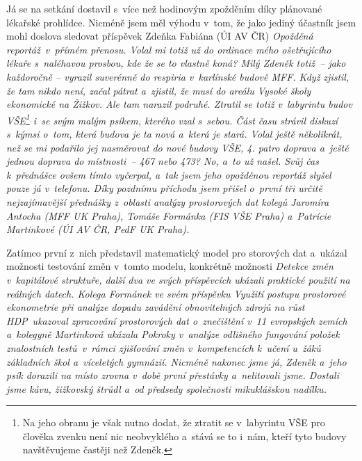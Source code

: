 Já se na setkání dostavil s~více než hodinovým zpožděním díky plánované lékařské prohlídce. Nicméně jsem měl výhodu v~tom, že jako jediný účastník jsem mohl doslova sledovat příspěvek Zdeňka Fabiána (ÚI AV ČR) \em Opožděná reportáž\em\ v~přímém přenosu. Volal mi totiž už do ordinace mého ošetřujícího lékaře s~naléhavou prosbou, kde že se to vlastně koná? Milý Zdeněk totiž~-- jako každoročně -- vyrazil suverénně do respiria v~karlínské budově MFF. Když zjistil, že tam nikdo není, začal pátrat a~zjistil, že musí do areálu Vysoké školy ekonomické na Žižkov. Ale tam narazil podruhé. Ztratil se totiž v~labyrintu budov VŠE\footnote{Na jeho obranu je však nutno dodat, že ztratit se v~labyrintu VŠE pro člověka zvenku není nic neobvyklého a~stává se to i~nám, kteří tyto budovy navštěvujeme častěji než Zdeněk.}
i~se svým malým psíkem, kterého vzal s~sebou. Část času strávil diskuzí s~kýmsi o~tom, která budova je ta nová a~která je stará. Volal ještě několikrát, než se mi podařilo jej nasměrovat do nové budovy VŠE, 4. patro doprava a~ještě jednou doprava do místnosti~-- 467 nebo 473? No, a~to už našel. Svůj čas k~přednášce ovšem tímto vyčerpal, a~tak jsem jeho opožděnou reportáž slyšel pouze já v~telefonu. Díky pozdnímu příchodu jsem přišel o~první tři určitě nejzajímavější přednášky z~oblasti analýzy prostorových dat kolegů Jaromíra Antocha (MFF UK Praha), Tomáše Formánka (FIS VŠE Praha) a~Patrície Martinkové (ÚI AV ČR, PedF UK Praha). 

Zatímco první z~nich představil matematický model pro%
storových dat
a~ukázal možnosti testování změn v~tomto modelu, konkrétně možnosti \em Detekce změn v~kapitálové struktuře\em, další dva ve svých příspěvcích ukázali praktické použití na reálných datech. Kolega Formánek ve svém příspěvku \em Využití postupu prostorové ekonometrie při analýze dopadu zavádění obnovitelných zdrojů na růst HDP\em\ ukazoval zpracování prostorových dat o~znečištění v~11 evropských zemích a~kolegyně Martinková ukázala \em Pokroky v~analýze odlišného fungování položek znalostních testů\em\ v~rámci zjišťování změn v~kompetencích k~učení u~žáků základních škol a~víceletých gymnázií. Nicméně nakonec jsme já, Zdeněk a~jeho psík dorazili na místo zrovna v~době první přestávky a~nelitovali jsme.
Dostali jsme kávu, žižkovský štrůdl a~od předsedy společnosti mikuklášskou nadílku.

